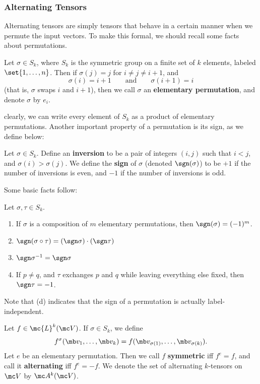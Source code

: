 \documentclass{fkbook}
\theoremstyle{snazzydefinition}
\begin{document}
\subsubsection{Alternating Tensors}
  Alternating tensors are simply tensors that behave in a certain
  manner when we permute the input vectors. To make this formal, we
  should recall some facts about permutations.
  \begin{definition}
    Let $\sigma \in S_k$, where $S_k$ is the symmetric group on a
    finite set of $k$ elements, labeled $\set{1, \ldots, n}$. Then if
    $\sigma(j) = j$ for $i \neq j \neq i+1$, and
    \[
      \sigma(i)= i+1 \qquad \text{and} \qquad \sigma(i+1) = i
    \]
    (that is, $\sigma$ swaps $i$ and $i+1$), then we call $\sigma$ an
    \textbf{elementary permutation}, and denote $\sigma$ by $e_i$.
  \end{definition}
  clearly, we can write every element of $S_k$ as a product of
  elementary permutations. Another important property of a permutation
  is its sign, as we define below:
  \begin{definition}
    Let $\sigma \in S_k$. Define an \textbf{inversion} to be a pair of
    integers $(i,j)$ such that $i<j$, and $\sigma(i) > \sigma(j)$. We
    define the \textbf{sign} of $\sigma$ (denoted $\sgn(\sigma)$) to
    be $+1$ if the number of inversions is even, and $-1$ if the
    number of inversions is odd.
  \end{definition}
  Some basic facts follow:
  \begin{lemma}
    Let $\sigma, \tau \in S_k$.
    \begin{enumerate}
      \item If $\sigma$ is a composition of $m$ elementary
        permutations, then $\sgn(\sigma) = (-1)^m$.
      \item $\sgn(\sigma \circ \tau) = (\sgn \sigma) \cdot (\sgn
        \tau)$
      \item $\sgn \sigma^{-1} = \sgn \sigma$
      \item If $p \neq q$, and $\tau$ exchanges $p$ and $q$ while
        leaving everything else fixed, then $\sgn \tau = -1$.
    \end{enumerate}
  \end{lemma}
  Note that (d) indicates that the sign of a permutation is actually
  label-independent.
  \begin{definition}
    Let $f \in \mc{L}^k(\mc V)$. If $\sigma \in S_k$, we define
    \[
      f^\sigma(\mb v_1, \ldots, \mb v_k) = f(\mb v_{\sigma(1)},
      \ldots, \mb v_{\sigma(k)}).
    \]
    Let $e$ be an elementary permutation. Then we call $f$
    \textbf{symmetric} iff $f^e = f$, and call it \textbf{alternating}
    iff $f^e = -f$. We denote the set of alternating $k$-tensors on
    $\mc V$ by $\mc A^k(\mc V)$.
  \end{definition}
\end{document}
